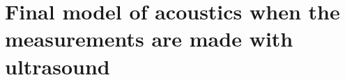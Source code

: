 








\section{Final model of acoustics when the measurements are made with ultrasound}\label{sec:Maxwell}

